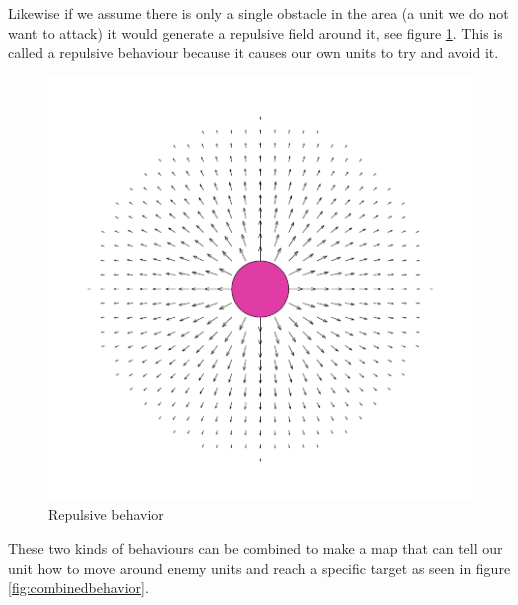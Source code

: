 	Likewise if we assume there is only a single obstacle in the area (a unit we do not want to attack) it would generate a repulsive field around it, 
	see figure \ref{fig:avoidbehavior}. This is called a repulsive behaviour because it causes our own units to try and avoid it.

		
	\begin{figure}[H]
		\begin{center}
			\includegraphics[scale=0.3]{Figures/Potentialfields/avoid.png}
			\caption{Repulsive behavior\cite{pft}}\label{fig:avoidbehavior}
		\end{center}
	\end{figure}
	\pagebreak
	These two kinds of behaviours can be combined to make a map that can tell our unit 
	how to move around enemy units and reach a specific target as seen in figure \ref{fig:combinedbehavior}.
			
